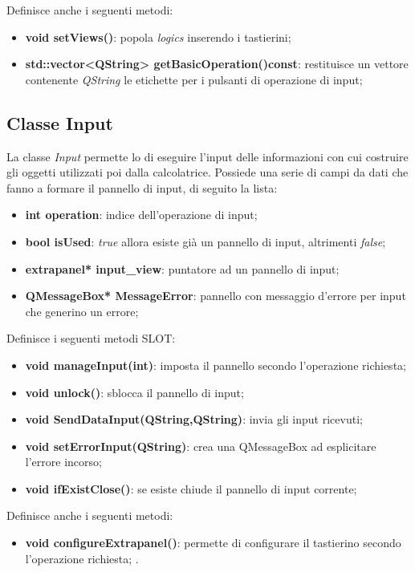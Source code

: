 \documentclass[a4paper,10pt]{article}
\begin{document}
        Definisce anche i seguenti metodi:
        \begin{itemize}
            \item \textbf{void setViews()}: popola \textit{logics} inserendo i tastierini;
            \item \textbf{std::vector<QString> getBasicOperation()const}: restituisce un vettore contenente \textit{QString} le etichette per i pulsanti di operazione di input;
        \end{itemize}

        \subsection{Classe Input}
        La classe \textit{Input} permette lo di eseguire l'input delle informazioni con cui costruire gli oggetti utilizzati poi dalla calcolatrice.
        Possiede una serie di campi da dati che fanno a formare il pannello di input, di seguito la lista:
        \begin{itemize}
            \item \textbf{int operation}: indice dell'operazione di input;
            \item \textbf{bool isUsed}: \textit{true} allora esiste già un pannello di input, altrimenti \textit{false};
            \item \textbf{extrapanel* input\_view}: puntatore ad un pannello di input;
            \item \textbf{QMessageBox* MessageError}: pannello con messaggio d'errore per input che generino un errore;
        \end{itemize}
        Definisce i seguenti metodi SLOT:
        \begin{itemize}
            \item \textbf{void manageInput(int)}: imposta il pannello secondo l'operazione richiesta;
            \item \textbf{void unlock()}: sblocca il pannello di input;
            \item \textbf{void SendDataInput(QString,QString)}: invia gli input ricevuti;
            \item \textbf{void setErrorInput(QString)}: crea una QMessageBox ad esplicitare l'errore incorso;
            \item \textbf{void ifExistClose()}: se esiste chiude il pannello di input corrente;
        \end{itemize}
        Definisce anche i seguenti metodi:
        \begin{itemize}
            \item \textbf{void configureExtrapanel()}: permette di configurare il tastierino secondo l'operazione richiesta;   .       
        \end{itemize}
\end{document}
